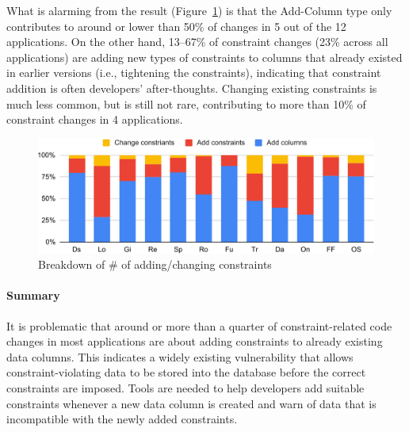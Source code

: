 

What is alarming from the result (Figure~\ref{fig:constraints-num})
is that the Add-Column type only 
contributes to around or lower than 50\% of changes in 
5 out of the %
12 applications. On the other hand, 13--67\% of constraint changes
(23\% across all applications) are adding new types of constraints to columns that already existed in earlier versions (i.e., tightening the constraints),
indicating that constraint addition is often developers' after-thoughts.
Changing existing constraints is much less common, but is still not rare, contributing to more than 10\% of constraint
changes in 4 applications.
 


\begin{figure} 
    \centering
    \includegraphics[width=0.6\columnwidth]{constraints//figs/breakdown-release.pdf}
    \caption{Breakdown of \# of adding/changing constraints 
\\   
}

    \label{fig:constraints-num}
\end{figure}


\paragraph{\bf Summary} It is problematic
that around or more than a quarter of constraint-related code changes in
most applications are about adding constraints to already existing data columns. This indicates a widely existing vulnerability that allows constraint-violating data to be stored into the database before the correct constraints are imposed. 
Tools are needed to help developers add 
suitable constraints whenever a new data column is created and 
warn of data that is incompatible with the newly added constraints.
  

